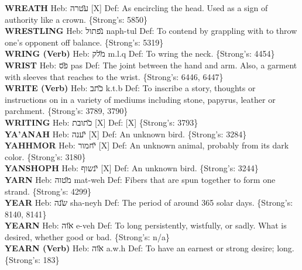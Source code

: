 {\textbf{WREATH} Heb: {\large\H עטרה} {[}X{]} Def: As encircling the head. Used as a sign of authority like a crown. \{Strong's: 5850\}\hfill{}\\

\textbf{WRESTLING} Heb: {\large\H נפתול} naph-tul Def: To contend by grappling with to throw one's opponent off balance. \{Strong's: 5319\}\hfill{}\\

\textbf{WRING (Verb)} Heb: {\large\H מלק} m.l.q Def: To wring the neck. \{Strong's: 4454\}\hfill{}\\

\textbf{WRIST} Heb: {\large\H פס} pas Def: The joint between the hand and arm. Also, a garment with sleeves that reaches to the wrist. \{Strong's: 6446, 6447\}\hfill{}\\

\textbf{WRITE (Verb)} Heb: {\large\H כתב} k.t.b Def: To inscribe a story, thoughts or instructions on in a variety of mediums including stone, papyrus, leather or parchment. \{Strong's: 3789, 3790\}\hfill{}\\

\textbf{WRITING} Heb: {\large\H כתובת} {[}X{]} Def: {[}X{]} \{Strong's: 3793\}\hfill{}\\

\textbf{YA'ANAH} Heb: {\large\H יענה} {[}X{]} Def: An unknown bird. \{Strong's: 3284\}\hfill{}\\

\textbf{YAHHMOR} Heb: {\large\H יחמור} {[}X{]} Def: An unknown animal, probably from its dark color. \{Strong's: 3180\}\hfill{}\\

\textbf{YANSHOPH} Heb: {\large\H ינשוף} {[}X{]} Def: An unknown bird. \{Strong's: 3244\}\hfill{}\\

\textbf{YARN} Heb: {\large\H מטוה} mat-weh Def: Fibers that are spun together to form one strand. \{Strong's: 4299\}\hfill{}\\

\textbf{YEAR} Heb: {\large\H שנה} sha-neyh Def: The period of around 365 solar days. \{Strong's: 8140, 8141\}\hfill{}\\

\textbf{YEARN} Heb: {\large\H אוה} e-veh Def: To long persistently, wistfully, or sadly. What is desired, whether good or bad. \{Strong's: n/a\}\hfill{}\\

\textbf{YEARN (Verb)} Heb: {\large\H אוה} a.w.h Def: To have an earnest or strong desire; long. \{Strong's: 183\}\hfill{}\\

}

